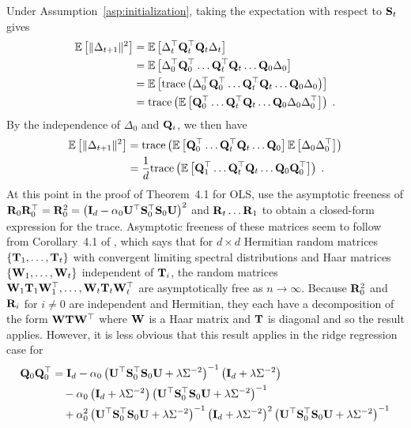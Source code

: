 Under Assumption~\ref{asp:initialization}, taking the expectation with respect to $\mathbf{S}_t$ gives
\begin{align*}
\mathbb{E}\left[\|\Delta_{t+1}\|^2\right] &= \mathbb{E}\left[\Delta_t^\top\mathbf{Q}_t^\top\mathbf{Q}_t\Delta_t\right] \\
&= \mathbb{E}\left[\Delta_0^\top\mathbf{Q}_0^\top\ldots \mathbf{Q}_t^\top\mathbf{Q}_t\ldots\mathbf{Q}_0\Delta_0\right] \\
&= \mathbb{E}\left[\mathrm{trace}\left(\Delta_0^\top\mathbf{Q}_0^\top\ldots \mathbf{Q}_t^\top\mathbf{Q}_t\ldots\mathbf{Q}_0\Delta_0\right)\right] \\
&= \mathrm{trace}\left(\mathbb{E}\left[\mathbf{Q}_0^\top\ldots \mathbf{Q}_t^\top\mathbf{Q}_t\ldots\mathbf{Q}_0\Delta_0\Delta_0^\top\right]\right) \;.
\end{align*}
By the independence of $\Delta_0$ and $\mathbf{Q}_i$, we then have
\begin{align*}
\mathbb{E}\left[\|\Delta_{t+1}\|^2\right] &= \mathrm{trace}\left(\mathbb{E}\left[\mathbf{Q}_0^\top\ldots \mathbf{Q}_t^\top\mathbf{Q}_t\ldots\mathbf{Q}_0\right]\mathbb{E}\left[\Delta_0\Delta_0^\top\right]\right) \\
&= \frac{1}{d}\mathrm{trace}\left(\mathbb{E}\left[\mathbf{Q}_1^\top\ldots \mathbf{Q}_t^\top\mathbf{Q}_t\ldots\mathbf{Q}_0\mathbf{Q}_0^\top\right]\right) \;.
\end{align*}
At this point in the proof of Theorem~4.1 for OLS, \citet{Lacotte:2020} use the asymptotic freeness of $\mathbf{R}_0\mathbf{R}_0^\top=\mathbf{R}_0^2=\left(\mathbf{I}_d-\alpha_0\mathbf{U}^\top\mathbf{S}_0^\top\mathbf{S}_0\mathbf{U}\right)^2$ and $\mathbf{R}_t\ldots\mathbf{R}_1$ to obtain a closed-form expression for the trace. Asymptotic freeness of these matrices seem to follow from Corollary~4.1 of \citep{Couillet:2011_free}, which says that for $d\times d$ Hermitian random matrices $\{\mathbf{T}_1,\ldots,\mathbf{T}_t\}$ with convergent limiting spectral distributions and Haar matrices $\{\mathbf{W}_1,\ldots,\mathbf{W}_t\}$ independent of $\mathbf{T}_i$, the random matrices $\mathbf{W}_1\mathbf{T}_1\mathbf{W}_1^\top,\ldots,\mathbf{W}_t\mathbf{T}_t\mathbf{W}_t^\top$ are asymptotically free as $n\rightarrow\infty$. Because $\mathbf{R}_0^2$ and $\mathbf{R}_i$ for $i\neq 0$ are independent and Hermitian, they each have a decomposition of the form $\mathbf{W}\mathbf{T}\mathbf{W}^\top$ where $\mathbf{W}$ is a Haar matrix and $\mathbf{T}$ is diagonal and so the result applies. However, it is less obvious that this result applies in the ridge regression case for
\begin{align*}
\mathbf{Q}_0\mathbf{Q}_0^\top &= \mathbf{I}_d - \alpha_0\left(\mathbf{U}^\top\mathbf{S}_0^\top\mathbf{S}_0\mathbf{U} + \lambda\Sigma^{-2}\right)^{-1}\left(\mathbf{I}_d + \lambda\Sigma^{-2}\right) \\
&\quad -  \alpha_0\left(\mathbf{I}_d + \lambda\Sigma^{-2}\right)\left(\mathbf{U}^\top\mathbf{S}_0^\top\mathbf{S}_0\mathbf{U} + \lambda\Sigma^{-2}\right)^{-1} \\
&\quad + \alpha_0^2\left(\mathbf{U}^\top\mathbf{S}_0^\top\mathbf{S}_0\mathbf{U} + \lambda\Sigma^{-2}\right)^{-1}\left(\mathbf{I}_d + \lambda\Sigma^{-2}\right)^2\left(\mathbf{U}^\top\mathbf{S}_0^\top\mathbf{S}_0\mathbf{U} + \lambda\Sigma^{-2}\right)^{-1}
\end{align*}
